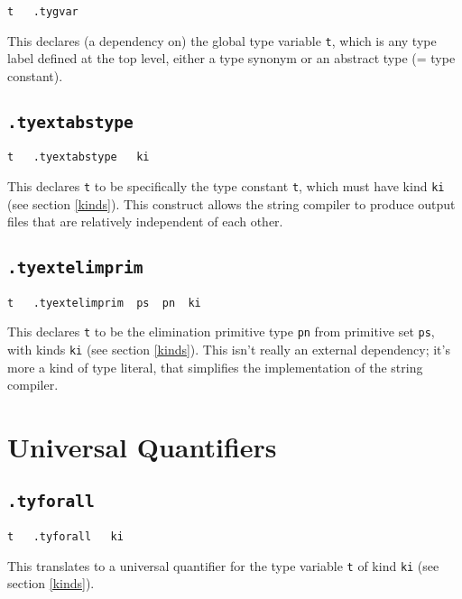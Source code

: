 \documentclass{report}
\newcommand\stringcode[1]{\texttt{#1}}
\begin{document}
\begin{verbatim}
t	.tygvar
\end{verbatim}

This declares (a dependency on) the global type variable \stringcode{t},
which is any type label defined at the top level, either a type synonym or an abstract type (= type constant).

\subsection{\stringcode{.tyextabstype}}

\begin{verbatim}
t	.tyextabstype	ki
\end{verbatim}

This declares \stringcode{t} to be specifically the type constant \stringcode{t},
which must have kind \stringcode{ki} (see section \ref{kinds}).
This construct allows the string compiler to produce output files that are relatively independent of each other.

\subsection{\stringcode{.tyextelimprim}}

\begin{verbatim}
t	.tyextelimprim	ps	pn	ki
\end{verbatim}

This declares \stringcode{t} to be the elimination primitive type \stringcode{pn} from primitive set \stringcode{ps},
with kinds \stringcode{ki} (see section \ref{kinds}).
This isn't really an external dependency;
it's more a kind of type literal, that simplifies the implementation of the string compiler.

\section{Universal Quantifiers}
\label{type_forall}

\subsection{\stringcode{.tyforall}}

\begin{verbatim}
t	.tyforall	ki
\end{verbatim}

This translates to a universal quantifier for the type variable \stringcode{t} of kind \stringcode{ki} (see section \ref{kinds}).
\end{document}
